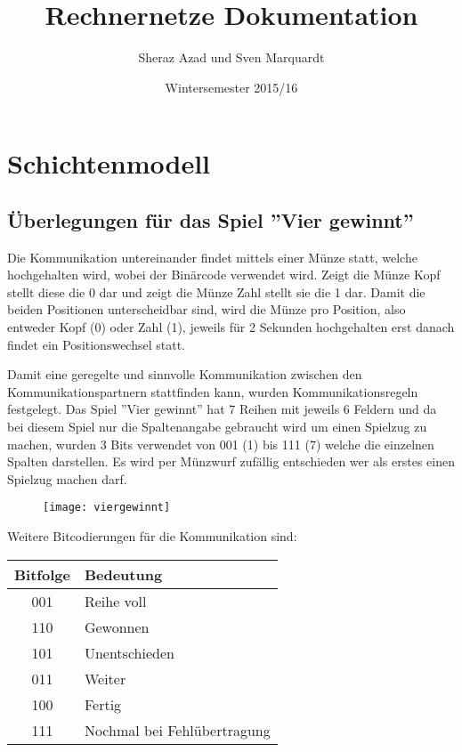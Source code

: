 \documentclass{scrartcl}
\begin{document}
  \title{Rechnernetze Dokumentation}
  \author{Sheraz Azad und Sven Marquardt}
  \date{Wintersemester 2015/16}
  \maketitle
  
  \tableofcontents  
  \newpage
\section[Versuch 1 Schichtenmodell]{Schichtenmodell}  
  \subsection[Aufgabe 2 Überlegungen für das Spiel Vier gewinnt]{Überlegungen für das Spiel ''Vier gewinnt''}
  
  Die Kommunikation untereinander findet mittels einer Münze statt, welche hochgehalten wird, wobei der Binärcode verwendet wird. Zeigt die Münze Kopf stellt diese die 0 dar und zeigt die Münze Zahl stellt sie die 1 dar. Damit die beiden Positionen unterscheidbar sind, wird die Münze pro Position, also entweder Kopf (0) oder Zahl (1), jeweils für 2 Sekunden hochgehalten erst danach findet ein Positionswechsel statt.
    
  Damit eine geregelte und sinnvolle Kommunikation zwischen den Kommunikationspartnern stattfinden kann, wurden Kommunikationsregeln festgelegt. Das Spiel ''Vier gewinnt'' hat 7 Reihen mit jeweils 6 Feldern und da bei diesem Spiel nur die Spaltenangabe gebraucht wird um einen Spielzug zu machen, wurden 3 Bits verwendet von 001 (1) bis 111 (7) welche die einzelnen Spalten darstellen. Es wird per Münzwurf zufällig entschieden wer als erstes einen Spielzug machen darf.
  
  \begin{figure}[htbp]
  \centering
  \texttt{[image: viergewinnt]}
    \end{figure}
    
  Weitere Bitcodierungen für die Kommunikation sind: 
  
    \begin{tabular}{|c|l}
      \textbf{Bitfolge} & \textbf{Bedeutung} \\ \hline
        001 & Reihe voll \\
      110 & Gewonnen \\
      101 & Unentschieden \\
      011 & Weiter \\
      100 & Fertig \\
      111 & Nochmal bei Fehlübertragung 
    \end{tabular}
  
\end{document}
